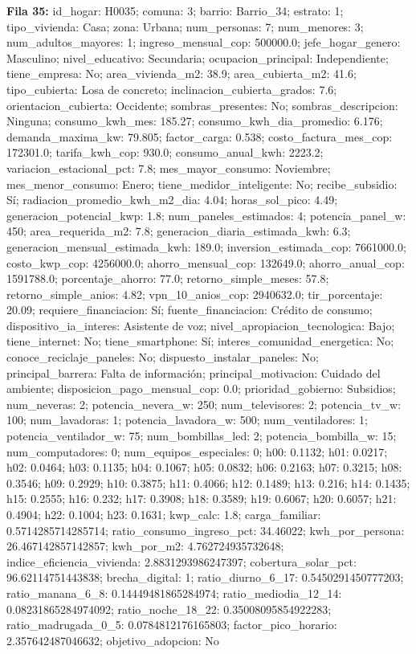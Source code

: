{\footnotesize\textbf{Fila 35:} id\_hogar: H0035; comuna: 3; barrio: Barrio\_34; estrato: 1; tipo\_vivienda: Casa; zona: Urbana; num\_personas: 7; num\_menores: 3; num\_adultos\_mayores: 1; ingreso\_mensual\_cop: 500000.0; jefe\_hogar\_genero: Masculino; nivel\_educativo: Secundaria; ocupacion\_principal: Independiente; tiene\_empresa: No; area\_vivienda\_m2: 38.9; area\_cubierta\_m2: 41.6; tipo\_cubierta: Losa de concreto; inclinacion\_cubierta\_grados: 7.6; orientacion\_cubierta: Occidente; sombras\_presentes: No; sombras\_descripcion: Ninguna; consumo\_kwh\_mes: 185.27; consumo\_kwh\_dia\_promedio: 6.176; demanda\_maxima\_kw: 79.805; factor\_carga: 0.538; costo\_factura\_mes\_cop: 172301.0; tarifa\_kwh\_cop: 930.0; consumo\_anual\_kwh: 2223.2; variacion\_estacional\_pct: 7.8; mes\_mayor\_consumo: Noviembre; mes\_menor\_consumo: Enero; tiene\_medidor\_inteligente: No; recibe\_subsidio: Sí; radiacion\_promedio\_kwh\_m2\_dia: 4.04; horas\_sol\_pico: 4.49; generacion\_potencial\_kwp: 1.8; num\_paneles\_estimados: 4; potencia\_panel\_w: 450; area\_requerida\_m2: 7.8; generacion\_diaria\_estimada\_kwh: 6.3; generacion\_mensual\_estimada\_kwh: 189.0; inversion\_estimada\_cop: 7661000.0; costo\_kwp\_cop: 4256000.0; ahorro\_mensual\_cop: 132649.0; ahorro\_anual\_cop: 1591788.0; porcentaje\_ahorro: 77.0; retorno\_simple\_meses: 57.8; retorno\_simple\_anios: 4.82; vpn\_10\_anios\_cop: 2940632.0; tir\_porcentaje: 20.09; requiere\_financiacion: Sí; fuente\_financiacion: Crédito de consumo; dispositivo\_ia\_interes: Asistente de voz; nivel\_apropiacion\_tecnologica: Bajo; tiene\_internet: No; tiene\_smartphone: Sí; interes\_comunidad\_energetica: No; conoce\_reciclaje\_paneles: No; dispuesto\_instalar\_paneles: No; principal\_barrera: Falta de información; principal\_motivacion: Cuidado del ambiente; disposicion\_pago\_mensual\_cop: 0.0; prioridad\_gobierno: Subsidios; num\_neveras: 2; potencia\_nevera\_w: 250; num\_televisores: 2; potencia\_tv\_w: 100; num\_lavadoras: 1; potencia\_lavadora\_w: 500; num\_ventiladores: 1; potencia\_ventilador\_w: 75; num\_bombillas\_led: 2; potencia\_bombilla\_w: 15; num\_computadores: 0; num\_equipos\_especiales: 0; h00: 0.1132; h01: 0.0217; h02: 0.0464; h03: 0.1135; h04: 0.1067; h05: 0.0832; h06: 0.2163; h07: 0.3215; h08: 0.3546; h09: 0.2929; h10: 0.3875; h11: 0.4066; h12: 0.1489; h13: 0.216; h14: 0.1435; h15: 0.2555; h16: 0.232; h17: 0.3908; h18: 0.3589; h19: 0.6067; h20: 0.6057; h21: 0.4904; h22: 0.1004; h23: 0.1631; kwp\_calc: 1.8; carga\_familiar: 0.5714285714285714; ratio\_consumo\_ingreso\_pct: 34.46022; kwh\_por\_persona: 26.467142857142857; kwh\_por\_m2: 4.762724935732648; indice\_eficiencia\_vivienda: 2.8831293986247397; cobertura\_solar\_pct: 96.62114751443838; brecha\_digital: 1; ratio\_diurno\_6\_17: 0.5450291450777203; ratio\_manana\_6\_8: 0.14449481865284974; ratio\_mediodia\_12\_14: 0.08231865284974092; ratio\_noche\_18\_22: 0.35008095854922283; ratio\_madrugada\_0\_5: 0.0784812176165803; factor\_pico\_horario: 2.357642487046632; objetivo\_adopcion: No\par}
